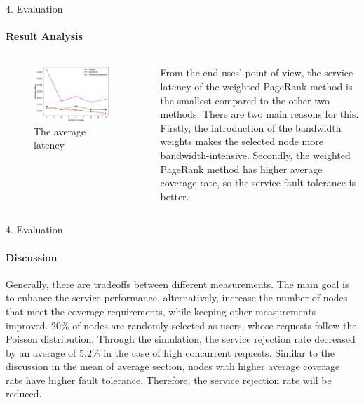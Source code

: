 \documentclass{beamer}		%
\begin{document}
\begin{frame}{4. Evaluation}
\framesubtitle{Result Analysis}
\begin{columns}
\begin{figure}
    \centering
    \includegraphics[width=0.9\textwidth]{Figure7.png}
    \caption{The average latency}
\end{figure}
From the end-uses’ point of view, the service latency of the weighted PageRank method is the smallest compared to the other two methods. There are two main reasons for this. Firstly, the introduction of the bandwidth weights makes the selected node more bandwidth-intensive. Secondly, the weighted PageRank method has higher average coverage rate, so the service fault tolerance is better.
\end{columns}
\end{frame}

\begin{frame}{4. Evaluation}
\framesubtitle{Discussion}
Generally, there are tradeoffs between different measurements. The main goal is to enhance the service performance, alternatively, increase the number of nodes that meet the coverage requirements, while keeping other measurements improved. 20\% of nodes are randomly selected as users, whose requests follow the Poisson distribution. Through the simulation, the service rejection rate decreased by an average of 5.2\% in the case of high concurrent requests. Similar to the discussion in the mean of average section, nodes with higher average coverage rate have higher fault tolerance. Therefore, the service rejection rate will be reduced.
\end{frame}
\end{document}
